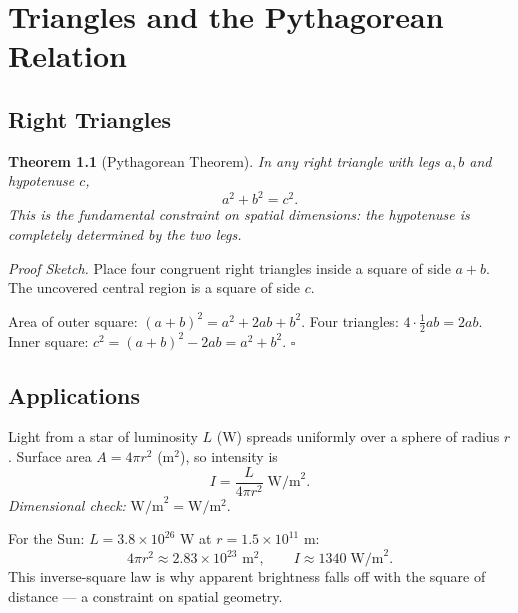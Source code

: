 \documentclass[11pt, openany]{book}
\theoremstyle{plain}
\newtheorem{theorem}{Theorem}[chapter]
\theoremstyle{definition}
\theoremstyle{remark}
\newenvironment{proofsketch}{\noindent\textit{Proof Sketch.}\;}{\hfill$\square$\par\medskip}
\begin{document}
\chapter{Triangles and the Pythagorean Relation}

\section{Right Triangles}

\begin{theorem}[Pythagorean Theorem]
In any right triangle with legs $a,b$ and hypotenuse $c$,
\[
  a^2+b^2=c^2.
\]
This is the fundamental constraint on spatial dimensions: the hypotenuse is
completely determined by the two legs.
\end{theorem}

\begin{proofsketch}
Place four congruent right triangles inside a square of side $a+b$.
The uncovered central region is a square of side $c$.

\begin{center}
\end{center}
Area of outer square: $(a+b)^2=a^2+2ab+b^2$. Four triangles: $4\cdot\tfrac12ab=2ab$.
Inner square: $c^2=(a+b)^2-2ab=a^2+b^2$.
\end{proofsketch}

\section{Applications}

\begin{myexample}
Light from a star of luminosity $L$ (W) spreads uniformly over a sphere of
radius $r$. Surface area $A=4\pi r^2$ (m$^2$), so intensity is
\[
  I = \frac{L}{4\pi r^2}\;\text{W/m}^2.
\]
\textit{Dimensional check:} $\text{W/m}^2=\text{W}/\text{m}^2$. \checkmark

For the Sun: $L=3.8\times10^{26}$ W at $r=1.5\times10^{11}$ m:
\[
  4\pi r^2\approx 2.83\times10^{23}\text{ m}^2,\qquad
  I\approx1340\;\text{W/m}^2.
\]
This inverse-square law is why apparent brightness falls off with the square of
distance --- a constraint on spatial geometry.
\end{myexample}
\end{document}
